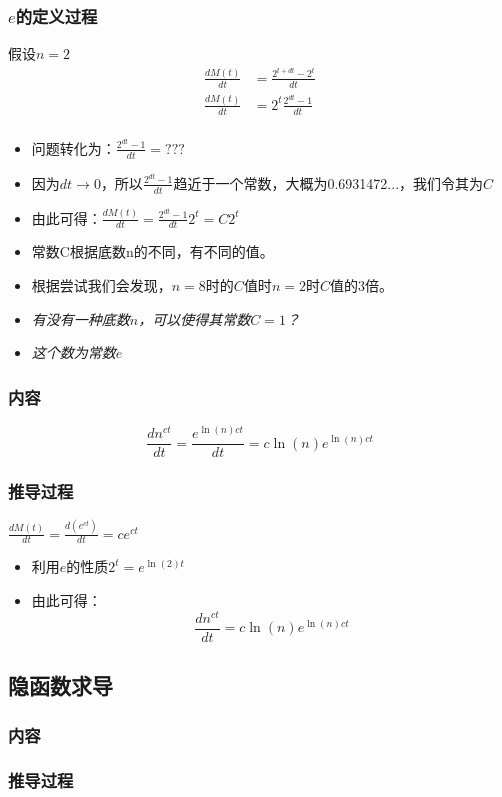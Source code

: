 \documentclass[UTF8]{ctexart}
\begin{document}
\subsubsection{$e$的定义过程}
假设$n=2$
\begin{align*}
	\frac{dM(t)}{dt} &= \frac{2^{t+dt}-2^t}{dt} \\
	\frac{dM(t)}{dt} &= 2^t\frac{2^{dt} - 1}{dt} \\
\end{align*}
\begin{itemize}
	\item 问题转化为：$\frac{2^{dt} - 1}{dt} = ???$
	\item 因为$dt\to0$，所以$\frac{2^{dt} - 1}{dt}$趋近于一个常数，大概为0.6931472...，我们令其为$C$
	\item 由此可得：$\frac{dM(t)}{dt} = \frac{2^{dt} - 1}{dt}2^t = C2^t$
	\item 常数C根据底数n的不同，有不同的值。
	\item 根据尝试我们会发现，$n=8$时的$C$值时$n=2$时$C$值的3倍。
	\item \emph{有没有一种底数$n$，可以使得其常数$C=1$？}
	\item \emph{这个数为常数$e$}
\end{itemize}
\subsubsection{内容}
$$\frac{dn^{ct}}{dt} = \frac{e^{\ln(n)ct}}{dt} = c\ln(n)e^{\ln(n)ct}$$
\subsubsection{推导过程}
$\frac{dM(t)}{dt} = \frac{d(e^{ct})}{dt} = ce^{ct}$
\begin{itemize}
	\item 利用$e$的性质$2^t = e^{\ln(2)t}$
	\item 由此可得：$$\frac{dn^{ct}}{dt} = c\ln(n)e^{\ln(n)ct}$$
\end{itemize}

\subsection{隐函数求导}
\subsubsection{内容}
\subsubsection{推导过程}
\end{document}

